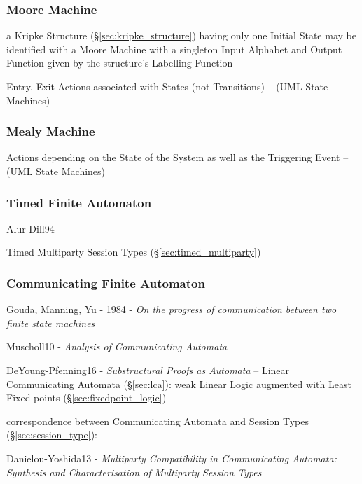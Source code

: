 \subsubsection{Moore Machine}\label{sec:moore_machine}


a Kripke Structure (\S\ref{sec:kripke_structure}) having only one
Initial State may be identified with a Moore Machine with a singleton
Input Alphabet and Output Function given by the structure's Labelling
Function

Entry, Exit Actions associated with States (not Transitions) -- (UML
State Machines)



\subsubsection{Mealy Machine}\label{sec:mealy_machine}


Actions depending on the State of the System as well as the Triggering
Event -- (UML State Machines)



\subsubsection{Timed Finite Automaton}\label{sec:timed_fsm}

Alur-Dill94

\fist Timed Multiparty Session Types (\S\ref{sec:timed_multiparty})



\subsubsection{Communicating Finite Automaton}
\label{sec:communicating_fsm}

Gouda, Manning, Yu - 1984 -
\emph{On the progress of communication between two finite state machines}

Muscholl10 - \emph{Analysis of Communicating Automata}

DeYoung-Pfenning16 - \emph{Substructural Proofs as Automata} -- Linear
Communicating Automata (\S\ref{sec:lca}): weak Linear Logic augmented
with Least Fixed-points (\S\ref{sec:fixedpoint_logic})

correspondence between Communicating Automata and Session Types
(\S\ref{sec:session_type}):

Danielou-Yoshida13 - \emph{Multiparty Compatibility in
  Communicating Automata: Synthesis and Characterisation of Multiparty
  Session Types}


